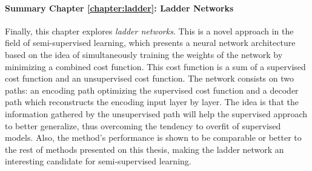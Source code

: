 \paragraph{Summary Chapter \ref{chapter:ladder}: Ladder Networks}

Finally, this chapter explores {\em ladder networks}. This is a novel approach
in the field of semi-supervised learning, which presents a neural network
architecture based on the idea of simultaneously training the weights of the
network by minimizing a combined cost function. This cost function is a sum of
a supervised cost function and an unsupervised cost function. The network
consists on two paths: an encoding path optimizing the supervised cost
function and a decoder path which reconstructs the encoding input layer by
layer. The idea is that the information gathered by the unsupervised path will
help the supervised approach to better generalize, thus overcoming the tendency
to overfit of supervised models. Also, the method's performance is shown to be
comparable or better to the rest of methods presented on this thesis, making
the ladder network an interesting candidate for semi-supervised learning.
